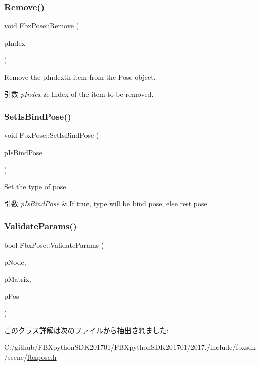 \subsubsection{\texorpdfstring{Remove()}{Remove()}}
{\footnotesize\ttfamily void Fbx\+Pose\+::\+Remove (\begin{DoxyParamCaption}\item[{int}]{p\+Index }\end{DoxyParamCaption})}

Remove the p\+Indexth item from the Pose object. 
\begin{DoxyParams}{引数}
{\em p\+Index} & Index of the item to be removed. \\
\hline
\end{DoxyParams}
\mbox{\label{class_fbx_pose_ac7248f7018e656e1f95e1824d5f3b529}} 
\subsubsection{\texorpdfstring{Set\+Is\+Bind\+Pose()}{SetIsBindPose()}}
{\footnotesize\ttfamily void Fbx\+Pose\+::\+Set\+Is\+Bind\+Pose (\begin{DoxyParamCaption}\item[{bool}]{p\+Is\+Bind\+Pose }\end{DoxyParamCaption})}

Set the type of pose. 
\begin{DoxyParams}{引数}
{\em p\+Is\+Bind\+Pose} & If true, type will be bind pose, else rest pose. \\
\hline
\end{DoxyParams}
\mbox{\label{class_fbx_pose_ae776ba435dfd811a0c720365bcb94682}} 
\subsubsection{\texorpdfstring{Validate\+Params()}{ValidateParams()}}
{\footnotesize\ttfamily bool Fbx\+Pose\+::\+Validate\+Params (\begin{DoxyParamCaption}\item[{const \hyperlink{class_fbx_node}{Fbx\+Node} $\ast$}]{p\+Node,  }\item[{const \hyperlink{class_fbx_matrix}{Fbx\+Matrix} \&}]{p\+Matrix,  }\item[{int \&}]{p\+Pos }\end{DoxyParamCaption})\hspace{0.3cm}{\ttfamily [protected]}}



このクラス詳解は次のファイルから抽出されました\+:\begin{DoxyCompactItemize}
\item 
C\+:/github/\+F\+B\+Xpython\+S\+D\+K201701/\+F\+B\+Xpython\+S\+D\+K201701/2017./include/fbxsdk/scene/\hyperlink{fbxpose_8h}{fbxpose.\+h}\end{DoxyCompactItemize}
